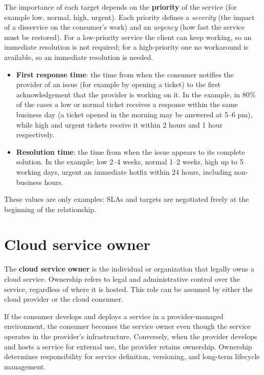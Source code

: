 The importance of each target depends on the \textbf{priority} of the service (for example low, normal, high, urgent). Each priority defines a \emph{severity} (the impact of a disservice on the consumer's work) and an \emph{urgency} (how fast the service must be restored). For a low-priority service the client can keep working, so an immediate resolution is not required; for a high-priority one no workaround is available, so an immediate resolution is needed.

\begin{itemize}
	\item \textbf{First response time}: the time from when the consumer notifies the provider of an issue (for example by opening a ticket) to the first acknowledgement that the provider is working on it. In the example, in 80\% of the cases a low or normal ticket receives a response within the same business day (a ticket opened in the morning may be answered at 5--6 pm), while high and urgent tickets receive it within 2 hours and 1 hour respectively.
	\item \textbf{Resolution time}: the time from when the issue appears to its complete solution. In the example: low 2--4 weeks, normal 1--2 weeks, high up to 5 working days, urgent an immediate hotfix within 24 hours, including non-business hours.
\end{itemize}

These values are only examples: SLAs and targets are negotiated freely at the beginning of the relationship.

\begin{center}
\end{center}

\section{Cloud service owner}

The \textbf{cloud service owner} is the individual or organization that legally owns a cloud service. Ownership refers to legal and administrative control over the service, regardless of where it is hosted. This role can be assumed by either the cloud provider or the cloud consumer.

If the consumer develops and deploys a service in a provider-managed environment, the consumer becomes the service owner even though the service operates in the provider's infrastructure. Conversely, when the provider develops and hosts a service for external use, the provider retains ownership. Ownership determines responsibility for service definition, versioning, and long-term lifecycle management.

